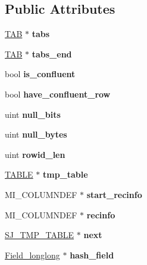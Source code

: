 \subsection*{Public Attributes}
\begin{DoxyCompactItemize}
\item 
\mbox{\label{classSJ__TMP__TABLE_aab7fc71e832105e2d21eff53d99dd3d4}} 
\mbox{\hyperlink{classSJ__TMP__TABLE_1_1TAB}{T\+AB}} $\ast$ {\bfseries tabs}
\item 
\mbox{\label{classSJ__TMP__TABLE_aa78979954f15841c2bae5838b1b8bf0e}} 
\mbox{\hyperlink{classSJ__TMP__TABLE_1_1TAB}{T\+AB}} $\ast$ {\bfseries tabs\+\_\+end}
\item 
\mbox{\label{classSJ__TMP__TABLE_aca98b1ef6069418e0e5c9562b0f948db}} 
bool {\bfseries is\+\_\+confluent}
\item 
\mbox{\label{classSJ__TMP__TABLE_aabcd49a7f851b871b19123b7f67fd219}} 
bool {\bfseries have\+\_\+confluent\+\_\+row}
\item 
\mbox{\label{classSJ__TMP__TABLE_a9328e04c05f5d151f737bcbc776114bf}} 
uint {\bfseries null\+\_\+bits}
\item 
\mbox{\label{classSJ__TMP__TABLE_ab92b281ad02bd011150d3de1fc10d79c}} 
uint {\bfseries null\+\_\+bytes}
\item 
\mbox{\label{classSJ__TMP__TABLE_a0d3d9cfe3e685fd45b6a0b4c78d54766}} 
uint {\bfseries rowid\+\_\+len}
\item 
\mbox{\label{classSJ__TMP__TABLE_a3ed9db8e76f4a4ff13a34a8f26bb7742}} 
\mbox{\hyperlink{structTABLE}{T\+A\+B\+LE}} $\ast$ {\bfseries tmp\+\_\+table}
\item 
\mbox{\label{classSJ__TMP__TABLE_af2ae84f6c6dcbedeb6e3665bfa6dfa4b}} 
M\+I\+\_\+\+C\+O\+L\+U\+M\+N\+D\+EF $\ast$ {\bfseries start\+\_\+recinfo}
\item 
\mbox{\label{classSJ__TMP__TABLE_a0ab70b503e229661b6130ba9821a17bb}} 
M\+I\+\_\+\+C\+O\+L\+U\+M\+N\+D\+EF $\ast$ {\bfseries recinfo}
\item 
\mbox{\label{classSJ__TMP__TABLE_a5619a3e86d140eaf7cbe2d2716c9edc5}} 
\mbox{\hyperlink{classSJ__TMP__TABLE}{S\+J\+\_\+\+T\+M\+P\+\_\+\+T\+A\+B\+LE}} $\ast$ {\bfseries next}
\item 
\mbox{\label{classSJ__TMP__TABLE_ae473cc12b43e3942c6f0ee79a4af566c}} 
\mbox{\hyperlink{classField__longlong}{Field\+\_\+longlong}} $\ast$ {\bfseries hash\+\_\+field}
\end{DoxyCompactItemize}
